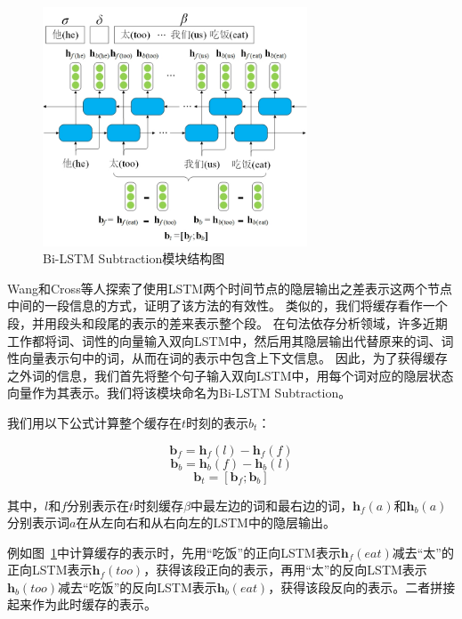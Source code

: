 \begin{figure}[hbtp]
	\centering
	\includegraphics[width=0.7\textwidth]{figures/bs.jpg}
	\caption{Bi-LSTM Subtraction模块结构图}
	\label{fig:bs}
\end{figure}

Wang和Cross等人探索了使用LSTM两个时间节点的隐层输出之差表示这两个节点中间的一段信息的方式，证明了该方法的有效性。\cite{wang-chang:2016:P16-1,cross-huang:2016:EMNLP2016}
类似的，我们将缓存看作一个段，并用段头和段尾的表示的差来表示整个段。
在句法依存分析领域，许多近期工作\cite{wang-EtAl:2016:N16-12,kiperwasser2016simple}都将词、词性的向量输入双向LSTM中，然后用其隐层输出代替原来的词、词性向量表示句中的词，从而在词的表示中包含上下文信息。
因此，为了获得缓存之外词的信息，我们首先将整个句子输入双向LSTM中，用每个词对应的隐层状态向量作为其表示。我们将该模块命名为Bi-LSTM Subtraction。

我们用以下公式计算整个缓存在$t$时刻的表示$b_t$：

\begin{equation}
	\mathbf{b}_f=\mathbf{h}_f(l)-\mathbf{h}_f(f)
\end{equation}
\begin{equation}
	\mathbf{b}_b=\mathbf{h}_b(f)-\mathbf{h}_b(l)
\end{equation}
\begin{equation}
	\mathbf{b}_t=[\mathbf{b}_f ; \mathbf{b}_b]
\end{equation}

其中，$l$和$f$分别表示在$t$时刻缓存$\beta$中最左边的词和最右边的词，$\mathbf{h}_f(a)$和$\mathbf{h}_b(a)$分别表示词$a$在从左向右和从右向左的LSTM中的隐层输出。

例如图~\ref{fig:bs}中计算缓存的表示时，先用“吃饭”的正向LSTM表示$\mathbf{h}_f(eat)$减去“太”的正向LSTM表示$\mathbf{h}_f(too)$，获得该段正向的表示，再用“太”的反向LSTM表示$\mathbf{h}_b(too)$减去“吃饭”的反向LSTM表示$\mathbf{h}_b(eat)$，获得该段反向的表示。二者拼接起来作为此时缓存的表示。

